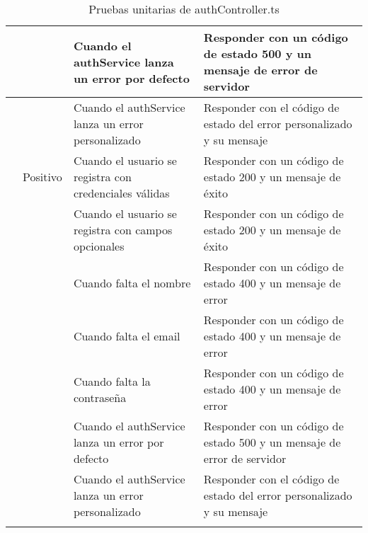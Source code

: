 \begin{small}
\begin{longtable}[H]{|>{\centering\arraybackslash}m{3cm}|>{\centering\arraybackslash}m{2cm}|>{\centering\arraybackslash}m{3cm}|>{\centering\arraybackslash}m{4cm}|}
		\cline{3-4}
		                                  &                             & Cuando el authService lanza un error por defecto         & Responder con un código de estado 500 y un mensaje de error de servidor \\
		\cline{3-4}
		                                  &                             & Cuando el authService lanza un error personalizado       & Responder con el código de estado del error personalizado y su mensaje  \\
		\hline
		\multirow{6}{4cm}{POST /register} & Positivo                    & Cuando el usuario se registra con credenciales válidas   & Responder con un código de estado 200 y un mensaje de éxito             \\
		\cline{2-4}
		                                  &                             & Cuando el usuario se registra con campos opcionales      & Responder con un código de estado 200 y un mensaje de éxito             \\
		\cline{2-4}
		                                  & \multirow{4}{3cm}{Negativo} & Cuando falta el nombre                                   & Responder con un código de estado 400 y un mensaje de error             \\
		\cline{3-4}
		                                  &                             & Cuando falta el email                                    & Responder con un código de estado 400 y un mensaje de error             \\
		\cline{3-4}
		                                  &                             & Cuando falta la contraseña                               & Responder con un código de estado 400 y un mensaje de error             \\
		\cline{3-4}
		                                  &                             & Cuando el authService lanza un error por defecto         & Responder con un código de estado 500 y un mensaje de error de servidor \\
		\cline{2-4}
		                                  & \multirow{1}{3cm}{Negativo} & Cuando el authService lanza un error personalizado       & Responder con el código de estado del error personalizado y su mensaje  \\
		\hline
		\caption{Pruebas unitarias de authController.ts}
	\end{longtable}
\end{small}

